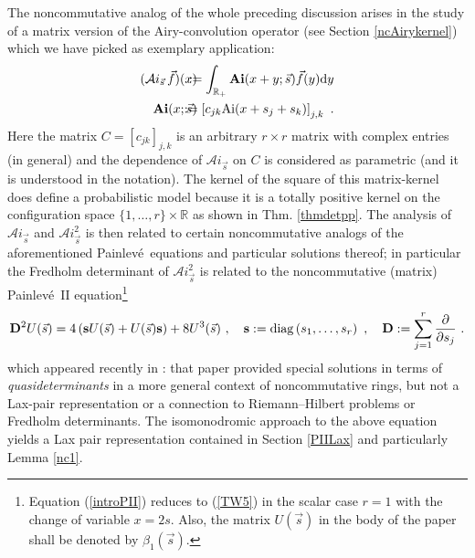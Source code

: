 \documentclass{article}
\def\ss{\mathbf s}
\def \D{{\mathbf D}}
\def\b{\beta}
\def\&{&\hspace{-20pt}}
\def\R{{\mathbb R}}
\def\d{{\rm d}}
\def \pa{\partial}
\def\Ai{\mathrm{Ai}}
\def\Ai{\mathrm{Ai}}
\newcommand{\be}{\begin{eqnarray}}
\newcommand{\ee}{\end{eqnarray}}
\def\le{\left}
\def\ri{\right}
\begin{document}
The noncommutative analog of the whole preceding discussion arises in the study of a matrix version of the Airy-convolution operator (see Section \ref{ncAirykernel}) which we have picked as exemplary application:
\be
(\mathcal Ai_{\vec s}\,\vec f)(x)&\&  := \int_{\R_+} {\mathbf {Ai}}(x+y;\vec s) \vec f(y)\d y\\
{\bf Ai} (x;\vec s)&\& := \le[c_{jk} \Ai(x+s_j+s_k)\ri]_{j,k}\ .
 \ee
Here the matrix $C=[c_{jk}]_{j,k}$ is an arbitrary $r\times r$ matrix with complex entries (in general) and the dependence of $\mathcal Ai_{\vec s}$ on $C$ is considered as parametric (and it is understood in the notation). The kernel of the square of this matrix-kernel does define a probabilistic model because it is a totally positive kernel on the configuration space $\{1,\dots, r\}\times \R$ as shown in Thm. \ref{thmdetpp}.
The analysis of $\mathcal Ai_{\vec s}$ and $\mathcal Ai_{\vec s}^2$ is then related to certain noncommutative analogs of the aforementioned Painlev\'e\ equations and particular solutions thereof; in particular the Fredholm determinant of $\mathcal Ai_{\vec s}^2$  is related to the noncommutative (matrix) Painlev\'e\ II equation\footnote{Equation (\ref{introPII}) reduces to (\ref{TW5}) in the scalar case $r=1$ with the change of variable $x=2s$. Also, the matrix $U(\vec s)$ in the body of the paper shall be denoted by $\b_1(\vec s)$.}
\be
\D^2 U(\vec s) = 4 \le( \ss U (\vec s) + U(\vec s) \ss\ri) + 8  U^3(\vec s)\ ,\ \ \  \ss:= {\rm diag} \le(s_1,\dots, s_r\ri) \ ,\ \ \ \D:= \sum_{j=1}^r \frac \pa{\pa s_j}\ .\label{introPII}
\ee
which appeared recently in \cite{RetakhRubtsov}: that paper provided special solutions in terms of {\em quasideterminants}
\cite{Gelfand2RetakhWilson} in a more general context of noncommutative rings, but not a Lax-pair representation or a connection to Riemann--Hilbert problems or Fredholm determinants.
 The isomonodromic approach to the above equation yields a Lax pair representation contained in Section \ref{PIILax} and particularly Lemma \ref{nc1}.  
\end{document}
